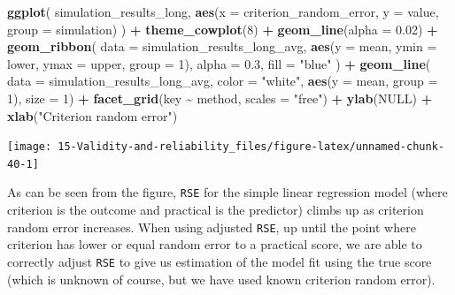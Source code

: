 \documentclass[
]{book}
\newenvironment{Shaded}{\begin{snugshade}}{\end{snugshade}}
\newcommand{\DataTypeTok}[1]{\textcolor[rgb]{0.13,0.29,0.53}{#1}}
\newcommand{\DecValTok}[1]{\textcolor[rgb]{0.00,0.00,0.81}{#1}}
\newcommand{\FloatTok}[1]{\textcolor[rgb]{0.00,0.00,0.81}{#1}}
\newcommand{\KeywordTok}[1]{\textcolor[rgb]{0.13,0.29,0.53}{\textbf{#1}}}
\newcommand{\NormalTok}[1]{#1}
\newcommand{\OperatorTok}[1]{\textcolor[rgb]{0.81,0.36,0.00}{\textbf{#1}}}
\newcommand{\OtherTok}[1]{\textcolor[rgb]{0.56,0.35,0.01}{#1}}
\newcommand{\StringTok}[1]{\textcolor[rgb]{0.31,0.60,0.02}{#1}}
\begin{document}
\begin{Shaded}
\begin{Highlighting}[]
\KeywordTok{ggplot}\NormalTok{(}
\NormalTok{  simulation\_results\_long,}
  \KeywordTok{aes}\NormalTok{(}\DataTypeTok{x =}\NormalTok{ criterion\_random\_error, }\DataTypeTok{y =}\NormalTok{ value, }\DataTypeTok{group =}\NormalTok{ simulation)}
\NormalTok{) }\OperatorTok{+}
\StringTok{  }\KeywordTok{theme\_cowplot}\NormalTok{(}\DecValTok{8}\NormalTok{) }\OperatorTok{+}
\StringTok{  }\KeywordTok{geom\_line}\NormalTok{(}\DataTypeTok{alpha =} \FloatTok{0.02}\NormalTok{) }\OperatorTok{+}
\StringTok{  }\KeywordTok{geom\_ribbon}\NormalTok{(}
    \DataTypeTok{data =}\NormalTok{ simulation\_results\_long\_avg,}
    \KeywordTok{aes}\NormalTok{(}\DataTypeTok{y =}\NormalTok{ mean, }\DataTypeTok{ymin =}\NormalTok{ lower, }\DataTypeTok{ymax =}\NormalTok{ upper, }\DataTypeTok{group =} \DecValTok{1}\NormalTok{),}
    \DataTypeTok{alpha =} \FloatTok{0.3}\NormalTok{, }\DataTypeTok{fill =} \StringTok{"blue"}
\NormalTok{  ) }\OperatorTok{+}
\StringTok{  }\KeywordTok{geom\_line}\NormalTok{(}
    \DataTypeTok{data =}\NormalTok{ simulation\_results\_long\_avg,}
    \DataTypeTok{color =} \StringTok{"white"}\NormalTok{,}
    \KeywordTok{aes}\NormalTok{(}\DataTypeTok{y =}\NormalTok{ mean, }\DataTypeTok{group =} \DecValTok{1}\NormalTok{),}
    \DataTypeTok{size =} \DecValTok{1}\NormalTok{) }\OperatorTok{+}
\StringTok{  }\KeywordTok{facet\_grid}\NormalTok{(key }\OperatorTok{\textasciitilde{}}\StringTok{ }\NormalTok{method, }\DataTypeTok{scales =} \StringTok{"free"}\NormalTok{) }\OperatorTok{+}
\StringTok{  }\KeywordTok{ylab}\NormalTok{(}\OtherTok{NULL}\NormalTok{) }\OperatorTok{+}
\StringTok{  }\KeywordTok{xlab}\NormalTok{(}\StringTok{"Criterion random error"}\NormalTok{)}
\end{Highlighting}
\end{Shaded}

\begin{center}\texttt{[image: 15-Validity-and-reliability\_files/figure-latex/unnamed-chunk-40-1]} \end{center}

As can be seen from the figure, \texttt{RSE} for the simple linear regression model (where criterion is the outcome and practical is the predictor) climbs up as criterion random error increases. When using adjusted \texttt{RSE}, up until the point where criterion has lower or equal random error to a practical score, we are able to correctly adjust \texttt{RSE} to give us estimation of the model fit using the true score (which is unknown of course, but we have used known criterion random error).
\end{document}
